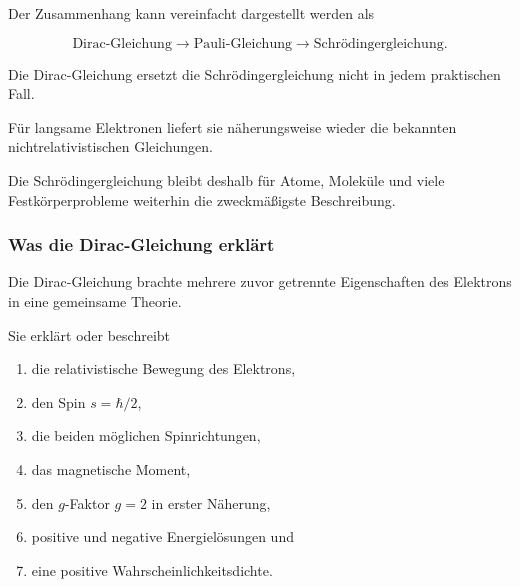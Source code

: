 Der Zusammenhang kann vereinfacht dargestellt werden als

\begin{equation}
	\text{Dirac-Gleichung}
	\longrightarrow
	\text{Pauli-Gleichung}
	\longrightarrow
	\text{Schrödingergleichung}.
	\label{eq:grenzfall_dirac_pauli_schroedinger}
\end{equation}

\begin{DidacticBox}
	\label{box:aeltere_theorie_bleibt_erhalten_dirac}
	
	Die Dirac-Gleichung ersetzt die Schrödingergleichung nicht in jedem
	praktischen Fall.
	
	Für langsame Elektronen liefert sie näherungsweise wieder die bekannten
	nichtrelativistischen Gleichungen.
	
	Die Schrödingergleichung bleibt deshalb für Atome, Moleküle und viele
	Festkörperprobleme weiterhin die zweckmäßigste Beschreibung.
\end{DidacticBox}

\subsubsection*{Was die Dirac-Gleichung erklärt}

Die Dirac-Gleichung brachte mehrere zuvor getrennte Eigenschaften des
Elektrons in eine gemeinsame Theorie.

Sie erklärt oder beschreibt

\begin{enumerate}
	\item die relativistische Bewegung des Elektrons,
	\item den Spin \(s=\hbar/2\),
	\item die beiden möglichen Spinrichtungen,
	\item das magnetische Moment,
	\item den \(g\)-Faktor \(g=2\) in erster Näherung,
	\item positive und negative Energielösungen und
	\item eine positive Wahrscheinlichkeitsdichte.
\end{enumerate}

